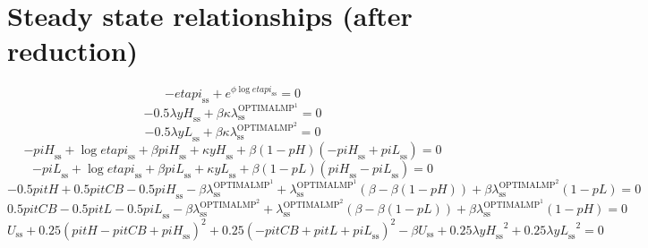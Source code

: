 \section{Steady state relationships (after reduction)}

\begin{equation}
-{e\!t\!a\!p\!i}_\mathrm{ss} + e^{{\phi} {\log{{e\!t\!a\!p\!i}_\mathrm{ss}}}} = 0
\end{equation}
\begin{equation}
-0.5{\lambda} {{y\!H}_\mathrm{ss}} + {\beta} {\kappa} {\lambda^{\mathrm{OPTIMALMP}^{\mathrm{1}}}_\mathrm{ss}} = 0
\end{equation}
\begin{equation}
-0.5{\lambda} {{y\!L}_\mathrm{ss}} + {\beta} {\kappa} {\lambda^{\mathrm{OPTIMALMP}^{\mathrm{2}}}_\mathrm{ss}} = 0
\end{equation}
\begin{equation}
-{p\!i\!H}_\mathrm{ss} + \log{{e\!t\!a\!p\!i}_\mathrm{ss}} + {\beta} {{p\!i\!H}_\mathrm{ss}} + {\kappa} {{y\!H}_\mathrm{ss}} + {\beta} \left(1 - {p\!H}\right) \left(-{p\!i\!H}_\mathrm{ss} + {p\!i\!L}_\mathrm{ss}\right) = 0
\end{equation}
\begin{equation}
-{p\!i\!L}_\mathrm{ss} + \log{{e\!t\!a\!p\!i}_\mathrm{ss}} + {\beta} {{p\!i\!L}_\mathrm{ss}} + {\kappa} {{y\!L}_\mathrm{ss}} + {\beta} \left(1 - {p\!L}\right) \left({p\!i\!H}_\mathrm{ss} - {p\!i\!L}_\mathrm{ss}\right) = 0
\end{equation}
\begin{equation}
-0.5{p\!i\!t\!H} + 0.5{p\!i\!t\!C\!B} - 0.5{p\!i\!H}_\mathrm{ss} - {\beta} {\lambda^{\mathrm{OPTIMALMP}^{\mathrm{1}}}_\mathrm{ss}} + {\lambda^{\mathrm{OPTIMALMP}^{\mathrm{1}}}_\mathrm{ss}} \left(\beta - {\beta} \left(1 - {p\!H}\right)\right) + {\beta} {\lambda^{\mathrm{OPTIMALMP}^{\mathrm{2}}}_\mathrm{ss}} \left(1 - {p\!L}\right) = 0
\end{equation}
\begin{equation}
0.5{p\!i\!t\!C\!B} - 0.5{p\!i\!t\!L} - 0.5{p\!i\!L}_\mathrm{ss} - {\beta} {\lambda^{\mathrm{OPTIMALMP}^{\mathrm{2}}}_\mathrm{ss}} + {\lambda^{\mathrm{OPTIMALMP}^{\mathrm{2}}}_\mathrm{ss}} \left(\beta - {\beta} \left(1 - {p\!L}\right)\right) + {\beta} {\lambda^{\mathrm{OPTIMALMP}^{\mathrm{1}}}_\mathrm{ss}} \left(1 - {p\!H}\right) = 0
\end{equation}
\begin{equation}
U_\mathrm{ss} + 0.25\left({p\!i\!t\!H} - {p\!i\!t\!C\!B} + {p\!i\!H}_\mathrm{ss}\right)^{2} + 0.25\left(-{p\!i\!t\!C\!B} + {p\!i\!t\!L} + {p\!i\!L}_\mathrm{ss}\right)^{2} - {\beta} {U_\mathrm{ss}} + 0.25{\lambda} {{y\!H}_\mathrm{ss}}^{2} + 0.25{\lambda} {{y\!L}_\mathrm{ss}}^{2} = 0
\end{equation}






